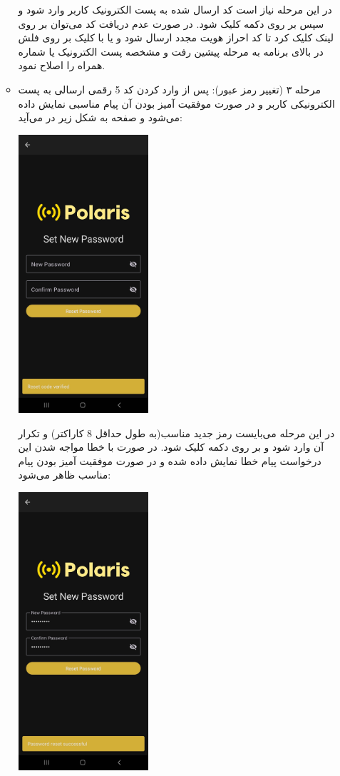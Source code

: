 \begin{itemize}
\begin{itemize}
\begin{center}
			\end{center}
		در این مرحله نیاز است کد ارسال شده به پست الکترونیک کاربر وارد شود و سپس بر روی دکمه  کلیک شود. در صورت عدم دریافت کد می‌توان بر روی لینک  کلیک کرد تا کد احراز هویت مجدد ارسال شود و یا با کلیک بر روی فلش در بالای برنامه به مرحله پیشین رفت و مشخصه پست الکترونیک یا شماره همراه را اصلاح نمود.
		\item  مرحله ۳ (تغییر رمز عبور): پس از وارد کردن کد 5 رقمی ارسالی به پست الکترونیکی کاربر و در صورت موفقیت آمیز بودن آن پیام مناسبی نمایش داده می‌شود و صفحه به شکل زیر در می‌آید:
			\begin{center}
				\includegraphics[width=0.4\textwidth]{images/new-pass-empty.jpg}
			\end{center}
		در این مرحله می‌بایست رمز جدید مناسب(به طول حداقل 8 کاراکتر) و تکرار آن وارد شود و بر روی دکمه  کلیک شود. در صورت با خطا مواجه شدن این درخواست پیام خطا نمایش داده شده و در صورت موفقیت آمیز بودن پیام مناسب ظاهر می‌شود:
			\begin{center}
				\includegraphics[width=0.4\textwidth]{images/new-pass-success.jpg}

\end{center}
\end{itemize}
\end{itemize}
